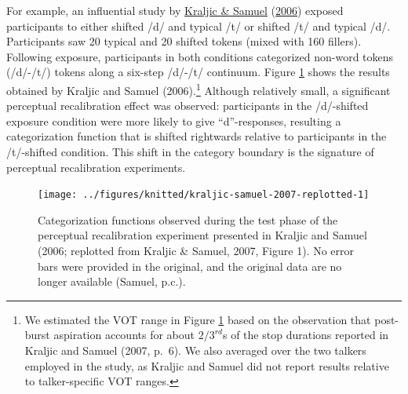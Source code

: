 \documentclass[
  11pt,
  english,
  man,floatsintext]{apa6}
\begin{document}
For example, an influential study by \protect\hyperlink{ref-kraljic-samuel2006}{Kraljic \& Samuel} (\protect\hyperlink{ref-kraljic-samuel2006}{2006}) exposed participants to either shifted /d/ and typical /t/ or shifted /t/ and typical /d/. Participants saw 20 typical and 20 shifted tokens (mixed with 160 fillers). Following exposure, participants in both conditions categorized non-word tokens (/d/-/t/) tokens along a six-step /d/-/t/ continuum. Figure \ref{fig:kraljic-samuel-2007-replotted} shows the results obtained by Kraljic and Samuel (2006).\footnote{We estimated the VOT range in Figure \ref{fig:kraljic-samuel-2007-replotted} based on the observation that post-burst aspiration accounts for about \(2/3^{rd}\)s of the stop durations reported in Kraljic and Samuel (2007, p.~6). We also averaged over the two talkers employed in the study, as Kraljic and Samuel did not report results relative to talker-specific VOT ranges.} Although relatively small, a significant perceptual recalibration effect was observed: participants in the /d/-shifted exposure condition were more likely to give ``d''-responses, resulting a categorization function that is shifted rightwards relative to participants in the /t/-shifted condition. This shift in the category boundary is the signature of perceptual recalibration experiments.



\begin{figure}

{\centering \texttt{[image: ../figures/knitted/kraljic-samuel-2007-replotted-1]} 

}

\caption{Categorization functions observed during the test phase of the perceptual recalibration experiment presented in Kraljic and Samuel (2006; replotted from Kraljic \& Samuel, 2007, Figure 1). No error bars were provided in the original, and the original data are no longer available (Samuel, p.c.).}\label{fig:kraljic-samuel-2007-replotted}
\end{figure}
\end{document}
